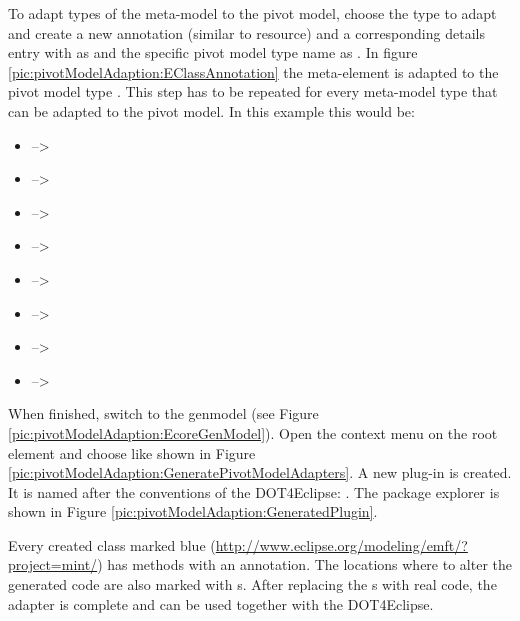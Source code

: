 To adapt types of the meta-model to the pivot model, choose the type to adapt and create a new annotation (similar to resource) and a corresponding details entry with  as  and the specific pivot model type name as . In figure \ref{pic:pivotModelAdaption:EClassAnnotation} the meta-element  is adapted to the pivot model type . This step has to be repeated for every meta-model type that can be adapted to the pivot model. In this example this would be:
\begin{itemize}
\item {} --\textgreater {}
\item {} --\textgreater {}
\item {} --\textgreater {}
\item {} --\textgreater {}
\item {} --\textgreater {}
\item {} --\textgreater {}
\item {} --\textgreater {}
\item {} --\textgreater {}
\end{itemize}

When finished, switch to the genmodel (see Figure \ref{pic:pivotModelAdaption:EcoreGenModel}). Open the context menu on the root element and choose  like shown in Figure \ref{pic:pivotModelAdaption:GeneratePivotModelAdapters}. A new plug-in is created. It is named after the conventions of the \acl{DOT4Eclipse}: . The package explorer is shown in Figure \ref{pic:pivotModelAdaption:GeneratedPlugin}.

Every created class marked blue (\url{http://www.eclipse.org/modeling/emft/?project=mint/}) has methods with an  annotation. The locations where to alter the generated code are also marked with s. After replacing the s with real code, the adapter is complete and can be used together with the \acl{DOT4Eclipse}. 

